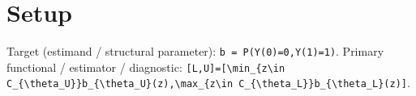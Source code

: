 \documentclass{article}
\begin{document}
\section{Setup}

Target (estimand / structural parameter): \texttt{b =\allowbreak{} P(Y(0)=\allowbreak{}0,\allowbreak{}Y(1)=\allowbreak{}1)}.
Primary functional / estimator / diagnostic: \texttt{[L,\allowbreak{}U]=\allowbreak{}[\textbackslash{}\allowbreak{}min\_\allowbreak{}\{z\textbackslash{}\allowbreak{}in C\_\allowbreak{}\{\textbackslash{}\allowbreak{}theta\_\allowbreak{}U\}\allowbreak{}\}\allowbreak{}b\_\allowbreak{}\{\textbackslash{}\allowbreak{}theta\_\allowbreak{}U\}\allowbreak{}(z),\allowbreak{}\textbackslash{}\allowbreak{}max\_\allowbreak{}\{z\textbackslash{}\allowbreak{}in C\_\allowbreak{}\{\textbackslash{}\allowbreak{}theta\_\allowbreak{}L\}\allowbreak{}\}\allowbreak{}b\_\allowbreak{}\{\textbackslash{}\allowbreak{}theta\_\allowbreak{}L\}\allowbreak{}(z)]}.
\end{document}
